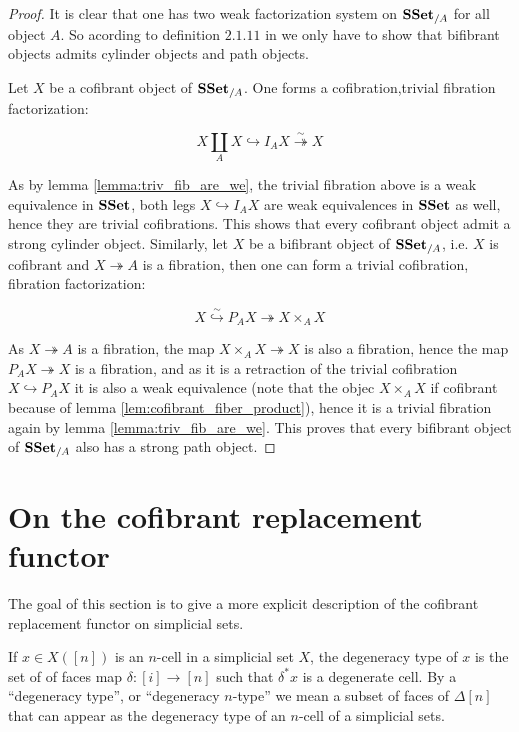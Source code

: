 \documentclass[reqno,10pt,a4paper,oneside,draft]{amsart}
\begin{document}
\begin{proof}

It is clear that one has two weak factorization system on $\mathbf{SSet}_{/A}$ for all object $A$. So acording to definition $2.1.11$ in \cite{henry2018wms} we only have to show that bifibrant objects admits cylinder objects and path objects.

Let $X$ be a cofibrant object of $\mathbf{SSet}_{/A}$. One forms a cofibration,trivial fibration factorization:

\[ X \coprod_A X \hookrightarrow I_A X \overset{\sim}{\twoheadrightarrow} X \]

As by lemma \ref{lemma:triv_fib_are_we}, the trivial fibration above is a weak equivalence in $\mathbf{SSet}$, both legs $X \hookrightarrow I_A X$ are weak equivalences in $\mathbf{SSet}$ as well, hence they are trivial cofibrations. This shows that every cofibrant object admit a strong cylinder object. Similarly, let $X$ be a bifibrant object of $\mathbf{SSet}_{/A}$, i.e. $X$ is cofibrant and $X \twoheadrightarrow A$ is a fibration, then one can form a trivial cofibration, fibration factorization:

\[ X \overset{\sim}{\hookrightarrow} P_A X {\twoheadrightarrow} X \times_{A} X \]

As $X \twoheadrightarrow A$ is a fibration, the map $X \times_A X \twoheadrightarrow X$ is also a fibration, hence the map $P_A X \twoheadrightarrow X$ is a fibration, and as it is a retraction of the trivial cofibration $X \hookrightarrow P_A X$ it is also a weak equivalence (note that the objec $X \times_A X$ if cofibrant because of lemma \ref{lem:cofibrant_fiber_product}), hence it is a trivial fibration again by lemma \ref{lemma:triv_fib_are_we}. This proves that every bifibrant object of $\mathbf{SSet}_{/A}$ also has a strong path object.

\end{proof}

\newpage

\section{On the cofibrant replacement functor}

The goal of this section is to give a more explicit description of the cofibrant replacement functor on simplicial sets.


\begin{definition}
If $x \in X([n])$ is an $n$-cell in a simplicial set $X$, the degeneracy type of $x$ is the set of of faces map $\delta:[i] \rightarrow [n]$ such that $\delta^* x$ is a degenerate cell. 
By a ``degeneracy type'', or ``degeneracy $n$-type'' we mean a subset of faces of $\Delta[n]$ that can appear as the degeneracy type of an $n$-cell of a simplicial sets.
\end{definition}
\end{document}
